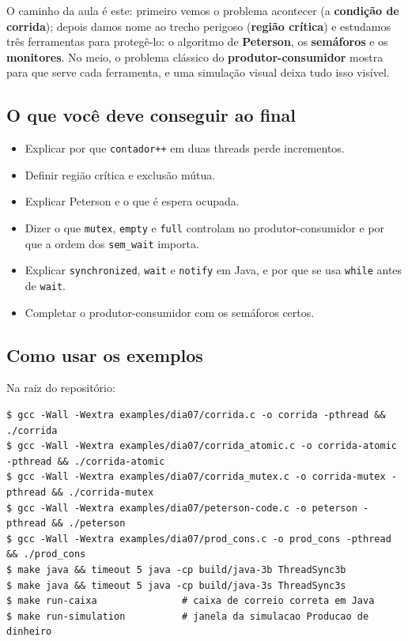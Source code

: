 \documentclass[11pt,a4paper]{article}
\newcommand{\cmd}[1]{\texttt{#1}}
\begin{document}
O caminho da aula é este: primeiro vemos o problema acontecer (a \textbf{condição de corrida}); depois damos nome ao trecho perigoso (\textbf{região crítica}) e estudamos três ferramentas para protegê-lo: o algoritmo de \textbf{Peterson}, os \textbf{semáforos} e os \textbf{monitores}. No meio, o problema clássico do \textbf{produtor-consumidor} mostra para que serve cada ferramenta, e uma simulação visual deixa tudo isso visível.

\subsection{O que você deve conseguir ao final}

\begin{itemize}
    \item Explicar por que \cmd{contador++} em duas threads perde incrementos.
    \item Definir região crítica e exclusão mútua.
    \item Explicar Peterson e o que é espera ocupada.
    \item Dizer o que \cmd{mutex}, \cmd{empty} e \cmd{full} controlam no produtor-consumidor e por que a ordem dos \cmd{sem\_wait} importa.
    \item Explicar \cmd{synchronized}, \cmd{wait} e \cmd{notify} em Java, e por que se usa \cmd{while} antes de \cmd{wait}.
    \item Completar o produtor-consumidor com os semáforos certos.
\end{itemize}

\subsection{Como usar os exemplos}

Na raiz do repositório:

\begin{lstlisting}[style=terminal]
$ gcc -Wall -Wextra examples/dia07/corrida.c -o corrida -pthread && ./corrida
$ gcc -Wall -Wextra examples/dia07/corrida_atomic.c -o corrida-atomic -pthread && ./corrida-atomic
$ gcc -Wall -Wextra examples/dia07/corrida_mutex.c -o corrida-mutex -pthread && ./corrida-mutex
$ gcc -Wall -Wextra examples/dia07/peterson-code.c -o peterson -pthread && ./peterson
$ gcc -Wall -Wextra examples/dia07/prod_cons.c -o prod_cons -pthread && ./prod_cons
$ make java && timeout 5 java -cp build/java-3b ThreadSync3b
$ make java && timeout 5 java -cp build/java-3s ThreadSync3s
$ make run-caixa               # caixa de correio correta em Java
$ make run-simulation          # janela da simulacao Producao de dinheiro
\end{lstlisting}
\end{document}
